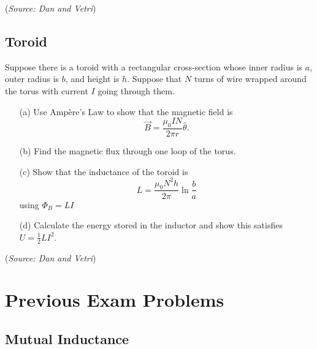 \documentclass{article}
\begin{document}
(\textit{Source: Dan and Vetri})

\subsection{Toroid}

Suppose there is a toroid with a rectangular cross-section whose inner radius is $a$, outer radius is $b$, and height is $h$. Suppose that $N$ turns of wire wrapped around the torus with current $I$ going through them.
\begin{itemize}
	\item[(a)] Use Amp\`ere's Law to show that the magnetic field is
	\[
	\vec{B} = \frac{\mu_0 I N}{2\pi r} \hat{\theta}.
	\]
	\item[(b)] Find the magnetic flux through one loop of the torus.
	\item[(c)] Show that the inductance of the toroid is 		\[
	L = \frac{\mu_0 N^2 h}{2\pi} \ln \frac{b}{a}
	\]
	using $\Phi_B = LI$
	\item[(d)] Calculate the energy stored in the inductor and show this satisfies $U = \frac{1}{2} LI^2$.
\end{itemize}

(\textit{Source: Dan and Vetri})

\section{Previous Exam Problems}

\subsection{Mutual Inductance}
\end{document}
